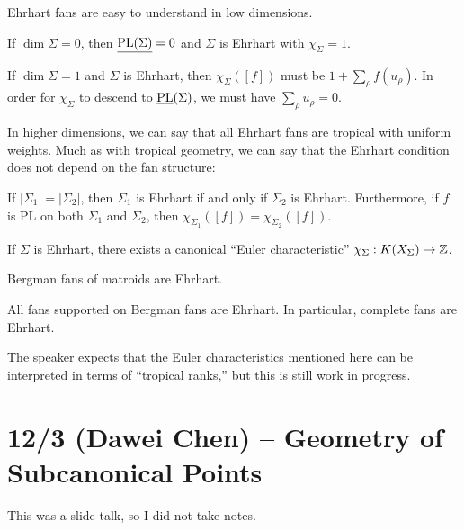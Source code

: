 \documentclass{amsart}
\begin{document}
Ehrhart fans are easy to understand in low dimensions.

\begin{ex}
	If $\dim \Sigma = 0$, then $\underline{\operatorname{PL}(\Sigma)} = 0$ and $\Sigma$ is Ehrhart with $\chi_\Sigma = 1$.
\end{ex}

\begin{ex}
	If $\dim \Sigma = 1$ and $\Sigma$ is Ehrhart, then $\chi_\Sigma([f])$ must be $1 + \sum_\rho f(u_\rho)$.
	In order for $\chi_\Sigma$ to descend to $\underline{\operatorname{PL}}(\Sigma)$, we must have $\sum_\rho u_\rho = 0$.
\end{ex}

In higher dimensions, we can say that all Ehrhart fans are tropical with uniform weights.
Much as with tropical geometry, we can say that the Ehrhart condition does not depend on the fan structure:

\begin{thm}[CCKR]
	If $|\Sigma_1| = |\Sigma_2|$, then $\Sigma_1$ is Ehrhart if and only if $\Sigma_2$ is Ehrhart.
	Furthermore, if $f$ is PL on both $\Sigma_1$ and $\Sigma_2$, then $\chi_{\Sigma_1}([f]) = \chi_{\Sigma_2}([f])$.
\end{thm}

\begin{cor}
	If $\Sigma$ is Ehrhart, there exists a canonical ``Euler characteristic'' $\chi_\Sigma: K(X_\Sigma) \to \mathbb{Z}$.
\end{cor}

\begin{thm}
	Bergman fans of matroids are Ehrhart.
\end{thm}

\begin{cor}
	All fans supported on Bergman fans are Ehrhart.
	In particular, complete fans are Ehrhart.
\end{cor}

The speaker expects that the Euler characteristics mentioned here can be interpreted in terms of ``tropical ranks,'' but this is still work in progress.

\section{12/3 (Dawei Chen) -- Geometry of Subcanonical Points}

This was a slide talk, so I did not take notes.
\end{document}
